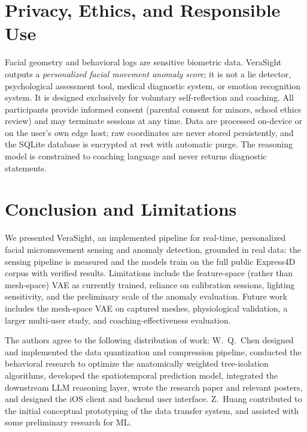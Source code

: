 \documentclass[sigconf]{acmart}
\begin{document}
\section{Privacy, Ethics, and Responsible Use}

Facial geometry and behavioral logs are sensitive biometric data. VeraSight
outputs a \emph{personalized facial movement anomaly score}; it is not a lie
detector, psychological assessment tool, medical diagnostic system, or emotion
recognition system. It is designed exclusively for voluntary self-reflection
and coaching. All participants provide informed consent (parental consent for
minors, school ethics review) and may terminate sessions at any time. Data are
processed on-device or on the user's own edge host; raw coordinates are never
stored persistently, and the SQLite database is encrypted at rest with
automatic purge. The reasoning model is constrained to coaching language and
never returns diagnostic statements.

\section{Conclusion and Limitations}

We presented VeraSight, an implemented pipeline for real-time, personalized
facial micromovement sensing and anomaly detection, grounded in real data: the
sensing pipeline is measured and the models train on the full public Express4D
corpus with verified results. Limitations include the feature-space (rather
than mesh-space) VAE as currently trained, reliance on calibration sessions,
lighting sensitivity, and the preliminary scale of the anomaly evaluation.
Future work includes the mesh-space VAE on captured meshes, physiological
validation, a larger multi-user study, and coaching-effectiveness evaluation.

\begin{acks}
The authors agree to the following distribution of work:
W.~Q.~Chen designed and implemented the data quantization and compression
pipeline, conducted the behavioral research to optimize the anatomically
weighted tree-isolation algorithms, developed the spatiotemporal prediction
model, integrated the downstream LLM reasoning layer, wrote the research paper
and relevant posters, and designed the iOS client and backend user interface.
Z.~Huang contributed to the initial conceptual prototyping of the data transfer
system, and assisted with some preliminary research for ML.
\end{acks}


\balance

\end{document}

